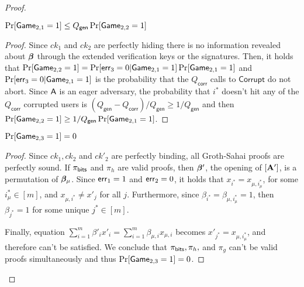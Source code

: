\begin{proof}
\begin{lemma} $\Pr[\mathsf{Game}_{2,1}=1] \leq Q_\mathsf{gen}\Pr[\mathsf{Game}_{2,2}=1]$
\end{lemma}
\begin{proof}
Since $ck_1$ and $ck_2$ are perfectly hiding there is no information revealed about ${\boldsymbol{\beta}}$ through the extended verification keys or the signatures. Then, it holds that $\Pr[\mathsf{Game}_{2,2}=1] = \Pr[\mathsf{err}_3=0|\mathsf{Game}_{2,1}=1]\Pr[\mathsf{Game}_{2,1}=1]$
and $ \Pr[\mathsf{err}_3=0|\mathsf{Game}_{2,1}=1]$ is the probability that the ${Q_\mathsf{corr}}$ calls to $\mathsf{Corrupt}$ do not abort. Since $\mathsf{A}$ is an eager adversary, the probability that $i^*$ doesn't hit any of the $Q_\mathsf{corr}$ corrupted users is $(Q_\mathsf{gen}-Q_\mathsf{corr})/Q_\mathsf{gen} \geq 1/Q_\mathsf{gen}$ and then $\Pr[\mathsf{Game}_{2,2}=1] \geq 1/Q_\mathsf{gen}\Pr[\mathsf{Game}_{2,1}=1]$.
\end{proof}

\begin{lemma}
$\Pr[\mathsf{Game}_{2,3}=1] = 0$
\end{lemma}
\begin{proof}
Since $ck_1,ck_2$ and $ck'_2$ are perfectly binding, all Groth-Sahai proofs are perfectly sound. If $\pi_{\mathsf{bits}}$ and $\pi_h$  are valid proofs, then ${\boldsymbol{\beta}}'$, the opening of $[\mathbf{{A}}']$, is a permutation of ${\boldsymbol{\beta}}_\mu$. Since $\mathsf{err}_1 = 1$ and $\mathsf{err}_2 = 0$, it holds that $x_{i^*} = x_{\mu, i^*_\mu}$, for some $i^*_\mu\in[m]$, and $x_{\mu,i^*}\neq x'_j$ for all $j$. Furthermore, since $\beta_{i^*} = \beta_{\mu,i^*_\mu}=1$, then $\beta_{j^*}=1$ for some unique $j^*\in[m]$.

Finally, equation $\sum_{i=1}^m\beta'_i x'_i = \sum_{i=1}^m \beta_{\mu,i}x_{\mu,i}$ becomes $x'_{j^*} = x_{\mu,i^*_\mu}$, and therefore can't be satisfied. We conclude that $\pi_{\mathsf{bits}},\pi_h,$ and $\pi_g$ can't be valid proofs simultaneously and thus $\Pr[\mathsf{Game}_{2,3}=1]=0$.
\end{proof}


\end{proof}
